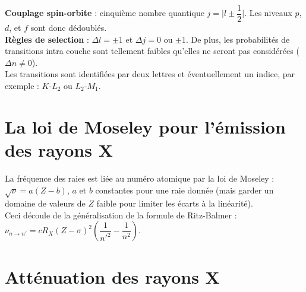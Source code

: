 \documentclass[13pt, twoside, a4paper, french, tikz]{report}
\begin{document}
    \textbf{Couplage spin-orbite} : cinquième nombre quantique $j = \bigg | l \pm \dfrac{1}{2} \bigg |$.
    Les niveaux $p$, $d$, et $f$ sont donc dédoublés.\\

    \textbf{Règles de selection} : $\Delta l = \pm 1$ et $\Delta j = 0$ ou $\pm 1$.
    De plus, les probabilités de transitions intra couche sont tellement faibles qu'elles ne seront pas considérées ($\Delta n \neq 0$).\\

    Les transitions sont identifiées par deux lettres et éventuellement un indice, par exemple : $K$-$L_2$ ou $L_2$-$M_1$.


    \section{La loi de Moseley pour l'émission des rayons X}\label{sec:la-loi-de-moseley-pour-l'emission-des-rayons-x}

    La fréquence des raies est liée au numéro atomique par la loi de Moseley : $\sqrt{\nu} = a(Z-b)$, $a$ et $b$ constantes pour une raie donnée (mais garder un domaine de valeurs de $Z$ faible pour limiter les écarts à la linéarité).\\
    Ceci découle de la généralisation de la formule de Ritz-Balmer : $\nu_{n\rightarrow n'} = c R_X (Z - \sigma)^2\left(\dfrac{1}{n'^2} - \dfrac{1}{n^2}\right)$.


    \section{Atténuation des rayons X}\label{sec:attenuation-des-rayons-x}
\end{document}
